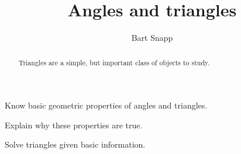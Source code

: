 \documentclass[handout,nooutcomes,noauthor]{ximera}
\title{Angles and triangles}
\author{Bart Snapp}
\begin{document}
\begin{abstract}
  Triangles are a simple, but important class of objects to study.
\end{abstract}
\maketitle


\begin{listOutcomes}
\item Know basic geometric properties of angles and triangles.
\item Explain why these properties are true.
\item Solve triangles given basic information.
\end{listOutcomes}
\end{document}
